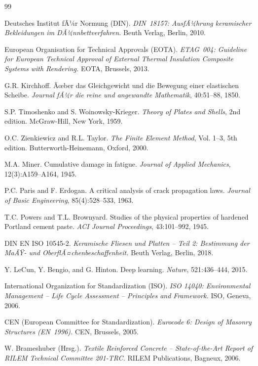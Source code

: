 ﻿\documentclass[a4paper,12pt]{article}
\theoremstyle{definition}
\begin{document}
\begin{thebibliography}{99}

Deutsches Institut fÃ¼r Normung (DIN).
\textit{DIN~18157: AusfÃ¼hrung keramischer Bekleidungen im DÃ¼nnbettverfahren.}
Beuth Verlag, Berlin, 2010.

European Organisation for Technical Approvals (EOTA).
\textit{ETAG~004: Guideline for European Technical Approval of External
Thermal Insulation Composite Systems with Rendering.}
EOTA, Brussels, 2013.

G.R. Kirchhoff.
Ãœber das Gleichgewicht und die Bewegung einer elastischen Scheibe.
\textit{Journal fÃ¼r die reine und angewandte Mathematik}, 40:51--88, 1850.

S.P. Timoshenko and S. Woinowsky-Krieger.
\textit{Theory of Plates and Shells}, 2nd edition.
McGraw-Hill, New York, 1959.

O.C. Zienkiewicz and R.L. Taylor.
\textit{The Finite Element Method}, Vol. 1--3, 5th edition.
Butterworth-Heinemann, Oxford, 2000.

M.A. Miner.
Cumulative damage in fatigue.
\textit{Journal of Applied Mechanics}, 12(3):A159--A164, 1945.

P.C. Paris and F. Erdogan.
A critical analysis of crack propagation laws.
\textit{Journal of Basic Engineering}, 85(4):528--533, 1963.

T.C. Powers and T.L. Brownyard.
Studies of the physical properties of hardened Portland cement paste.
\textit{ACI Journal Proceedings}, 43:101--992, 1945.

DIN EN ISO 10545-2.
\textit{Keramische Fliesen und Platten -- Teil 2: Bestimmung der
MaÃŸ- und OberflÃ¤chenbeschaffenheit.}
Beuth Verlag, Berlin, 2018.

Y. LeCun, Y. Bengio, and G. Hinton.
Deep learning.
\textit{Nature}, 521:436--444, 2015.

International Organization for Standardization (ISO).
\textit{ISO 14040: Environmental Management -- Life Cycle Assessment --
Principles and Framework.}
ISO, Geneva, 2006.

CEN (European Committee for Standardization).
\textit{Eurocode 6: Design of Masonry Structures (EN~1996).}
CEN, Brussels, 2005.

W. Brameshuber (Hrsg.).
\textit{Textile Reinforced Concrete -- State-of-the-Art Report of RILEM
Technical Committee 201-TRC.}
RILEM Publications, Bagneux, 2006.

\end{thebibliography}
\end{document}

